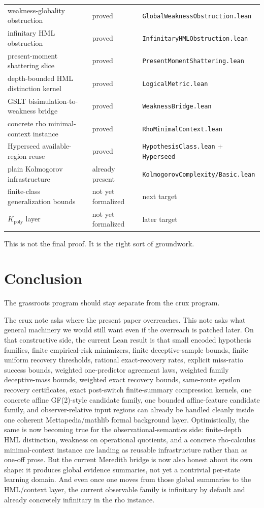 \documentclass[11pt]{article}
\theoremstyle{remark}
\begin{document}
\begin{center}
\begin{tabular}{lll}
weakness-globality obstruction & proved & \texttt{GlobalWeaknessObstruction.lean} \\
infinitary HML obstruction & proved & \texttt{InfinitaryHMLObstruction.lean} \\
present-moment shattering slice & proved & \texttt{PresentMomentShattering.lean} \\
depth-bounded HML distinction kernel & proved & \texttt{LogicalMetric.lean} \\
GSLT bisimulation-to-weakness bridge & proved & \texttt{WeaknessBridge.lean} \\
concrete rho minimal-context instance & proved & \texttt{RhoMinimalContext.lean} \\
Hyperseed available-region reuse & proved & \texttt{HypothesisClass.lean} + \texttt{Hyperseed} \\
plain Kolmogorov infrastructure & already present & \texttt{KolmogorovComplexity/Basic.lean} \\
finite-class generalization bounds & not yet formalized & next target \\
\(K_{\mathrm{poly}}\) layer & not yet formalized & later target \\
\bottomrule
\end{tabular}
\end{center}

This is not the final proof.  It is the right sort of groundwork.

\section{Conclusion}

The grassroots program should stay separate from the crux program.

The crux note asks where the present paper overreaches.  This note asks what
general machinery we would still want even if the overreach is patched later.
On that constructive side, the current Lean result is that small encoded
hypothesis families, finite empirical-risk minimizers, finite deceptive-sample
bounds, finite uniform recovery thresholds, rational exact-recovery rates,
explicit miss-ratio success bounds, weighted one-predictor agreement laws,
weighted family deceptive-mass bounds, weighted exact recovery bounds,
same-route epsilon recovery certificates, exact post-switch finite-summary
compression kernels, one concrete affine GF(2)-style
candidate family, one bounded affine-feature candidate family, and
observer-relative input regions can already be handled cleanly inside one
coherent Mettapedia/mathlib formal background layer.  Optimistically, the same is
now becoming true for the observational-semantics side: finite-depth HML
distinction, weakness on operational quotients, and a concrete rho-calculus
minimal-context instance are landing as reusable infrastructure rather than as
one-off prose.  But the current Meredith bridge is now also honest about its own
shape: it produces global evidence summaries, not yet a nontrivial per-state
learning domain.  And even once one moves from those global summaries to the
HML/context layer, the current observable family is infinitary by default and
already concretely infinitary in the rho instance.
\end{document}
